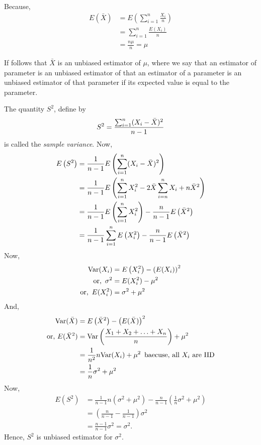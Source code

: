 Because, 
\begin{align*}
	E(\bar{X}) & = E\left( \sum_{i=1}^{n} \frac{X_i}{n} \right) \\ 
	           & = \sum_{i=1}^{n} \frac{E(X_i)}{n}              \\ 
	           & = \frac{n \mu}{n} = \mu
\end{align*}

If follows that $ \bar{X} $ is an unbiased estimator of $ \mu $, where we say that an estimator
of parameter is an unbiased estimator of that an estimator of a parameter is an unbiased estimator
of that parameter if its expected value is equal to the parameter.

The quantity $ S ^{2} $, define by 
\[
    S ^{2} = \frac{\sum_{i=1}^{n}(X_i - \Bar{X})^{2} }{n-1}
\]
is called the \textit{sample variance}.
Now, 
\begin{align*}
    E\left(S^{2} \right) &= \frac{1}{n-1} E\left( \sum_{i = 1}^{n}(X_i - \Bar{X} )^{2}  \right)\\ 
                         &= \frac{1}{n-1} E\left( \sum_{i=1}^{n}X_i^{2} - 2\Bar{X} \sum_{i=n}^{n} X_i + n \Bar{X}^{2}  \right)\\
                         &= \frac{1}{n-1}E\left( \sum_{i=1}^{n}X_i^{2}\right) - \frac{n}{n-1} E\left( \Bar{X}^{2} \right) \\
                         &= \frac{1}{n-1}\sum_{i=1}^{n}E\left( X_i^{2}\right) - \frac{n}{n-1} E\left( \Bar{X}^{2} \right)
\end{align*}
Now,
\begin{align*}
    \text{Var}(X_i) &= E\left( X_i^{2} \right) - \left( E(X_i) \right)^{2} \\
    \text{or, }\, \sigma^{2} &= E(X_i^{2}) - \mu^{2} \\ 
    \text{or, }\, E(X_i^{2}) &= \sigma^{2} + \mu^{2} 
\end{align*}
And,
\begin{align*}
    \text{Var}(\Bar{X}) &= E\left( \Bar{X}^{2} \right) - \left( E(\bar{X}) \right)^{2}\\ 
    \text{or, } E(\bar{X}^{2}) &= \text{Var}\left( \frac{X_1+X_2+\ldots+X_n}{n} \right) + \mu^{2} \\ 
                             &= \frac{1}{n^{2}} n\text{Var}(X_i) + \mu^{2} \, \text{ baecuse, all }X_i\text{ are IID} \\
                            &= \frac{1}{n}\sigma^{2} + \mu^{2}
\end{align*}
Now,
\begin{align*}
    E\left( S^{2} \right) &= \frac{1}{n-1}n\left( \sigma^{2} + \mu^{2} \right) - \frac{n}{n-1}\left( \frac{1}{n}\sigma^{2} + \mu^{2} \right)\\ 
                          &= \left( \frac{n}{n-1} - \frac{1}{n-1} \right)\sigma^{2} \\ 
                          &= \frac{n-1}{n-1}\sigma^{2} = \sigma^{2}.
\end{align*}
Hence, $ S^{2} $ is unbiased estimator for $ \sigma ^{2} $.
